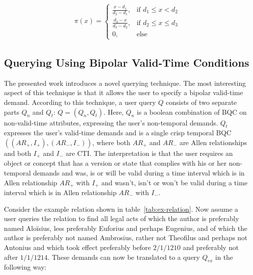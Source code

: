 \documentclass[runningheads,a4paper]{llncs}
\begin{document}
\vspace{-10pt}
\begin{align}
\pi(x) =
\begin{cases}
\frac{x - d_1}{d_2 - d_1}, & \text{if } d_1 \leq x < d_2 \\
\frac{d_3 - x}{d_3 - d_2}, & \text{if } d_2 \leq x \leq d_3 \\
0, & \text{else}
\end{cases}
\end{align}
\vspace{-15pt}

\subsection{Querying Using Bipolar Valid-Time Conditions \label{sec:query}}
The presented work introduces a novel querying technique. The most interesting aspect of this technique is that it allows the user to specify a bipolar valid-time demand. According to this technique, a user query $Q$ consists of two separate parts $Q_n$ and $Q_t$: $Q = (Q_n, Q_t)$. Here, $Q_n$ is a boolean combination of BQC on non-valid-time attributes, expressing the user's non-temporal demands. $Q_t$ expresses the user's valid-time demands and is a single crisp temporal BQC $((AR_{+}, I_{+}), (AR_{-}, I_{-}))$, where both $AR_{+}$ and $AR_{-}$ are Allen relationships and both $I_{+}$ and $I_{-}$ are CTI. The interpretation is that the user requires an object or concept that has a version or state that complies with his or her non-temporal demands and was, is or will be valid during a time interval which is in Allen relationship $AR_{+}$ with $I_{+}$ and wasn't, isn't or won't be valid during a time interval which is in Allen relationship $AR_{-}$ with $I_{-}$.

Consider the example relation shown in table~\ref{tab:ex-relation}. Now assume a user queries the relation to find all legal acts of which the author is preferably named Alo\"isius, less preferably Euforius and perhaps Eugenius, and of which the author is preferably not named Ambrosius, rather not Theofilus and perhaps not Antonius and which took effect preferably before $2/1/1210$ and preferably not after $1/1/1214$. These demands can now be translated to a query $Q_{ex}$ in the following way:
\end{document}
